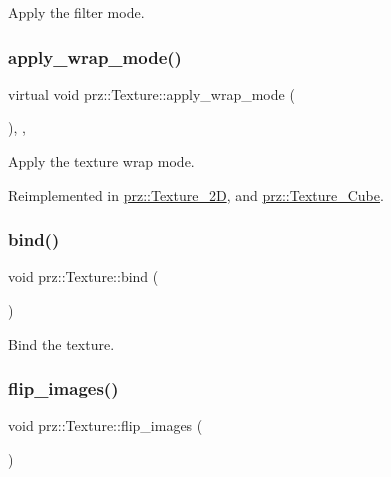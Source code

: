 Apply the filter mode. 

\mbox{\label{classprz_1_1_texture_ad68b4a5a4032f74d3ea719f26f78b202}} 
\subsubsection{\texorpdfstring{apply\_wrap\_mode()}{apply\_wrap\_mode()}}
{\footnotesize\ttfamily virtual void prz\+::\+Texture\+::apply\+\_\+wrap\+\_\+mode (\begin{DoxyParamCaption}{ }\end{DoxyParamCaption})\hspace{0.3cm}{\ttfamily [inline]}, {\ttfamily [protected]}, {\ttfamily [virtual]}}



Apply the texture wrap mode. 



Reimplemented in \mbox{\hyperlink{classprz_1_1_texture__2_d_ac8639f22c51ad83198fb8d1a7c257ac2}{prz\+::\+Texture\+\_\+2D}}, and \mbox{\hyperlink{classprz_1_1_texture___cube_aa3657f6c55bec9d78032d4b7658b3154}{prz\+::\+Texture\+\_\+\+Cube}}.

\mbox{\label{classprz_1_1_texture_afd48365ad270a9937e9d71c5a371e138}} 
\subsubsection{\texorpdfstring{bind()}{bind()}}
{\footnotesize\ttfamily void prz\+::\+Texture\+::bind (\begin{DoxyParamCaption}{ }\end{DoxyParamCaption})\hspace{0.3cm}{\ttfamily [inline]}}



Bind the texture. 

\mbox{\label{classprz_1_1_texture_a22bb0df706f6b81f8a908708a724e67c}} 
\subsubsection{\texorpdfstring{flip\_images()}{flip\_images()}}
{\footnotesize\ttfamily void prz\+::\+Texture\+::flip\+\_\+images (\begin{DoxyParamCaption}{ }\end{DoxyParamCaption})\hspace{0.3cm}{\ttfamily [inline]}}




